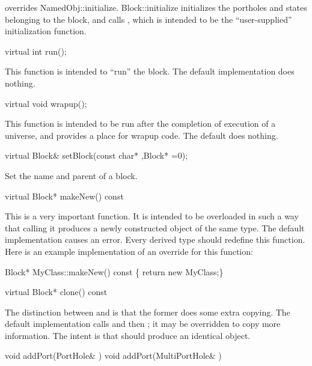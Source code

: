 overrides NamedObj::initialize.  Block::initialize initializes the
portholes and states belonging to the block, and calls , which
is intended to be the ``user-supplied'' initialization function.

\begin{example}
virtual int run();
\end{example}

This function is intended to ``run'' the block.  The default
implementation does nothing.

\begin{example}
virtual void wrapup();
\end{example}

This function is intended to be run after the completion of execution
of a universe, and provides a place for wrapup code.  The default does
nothing.

\begin{example}
virtual Block& setBlock(const char* ,Block* =0);
\end{example}

Set the name and parent of a block.

\begin{example}
virtual Block* makeNew() const
\end{example}

This is a very important function.  It is intended to be overloaded in
such a way that calling it produces a newly constructed object of the
same type.  The default implementation causes an error.  Every derived
type should redefine this function.  Here is an example implementation
of an override for this function:

\begin{example}
Block* MyClass::makeNew() const \{ return new MyClass;\}
\end{example}

\begin{example}
virtual Block* clone() const
\end{example}

The distinction between  and  is that the
former does some extra copying.  The default implementation calls
 and then ; it may be overridden to
copy more information.  The intent is that  should produce
an identical object.

\begin{example}
void addPort(PortHole& )
void addPort(MultiPortHole& )
\end{example}

